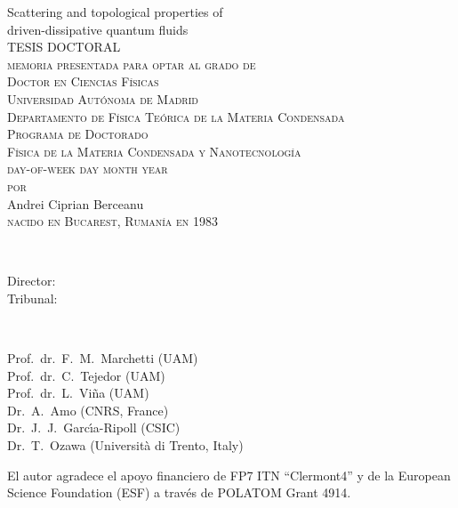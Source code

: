 \thispagestyle{empty}

\begin{center}
{\Huge  Scattering and topological properties of \\ driven-dissipative quantum fluids\\}
\vspace{5.4cm}
{\large{TESIS DOCTORAL}}\\
\vspace{2.6cm}
{ \textsc{memoria presentada para optar al grado de \\ Doctor en Ciencias F\'{i}sicas\\
Universidad Aut\'{o}noma de Madrid\\
Departamento de F\'{i}sica Te\'{o}rica de la Materia Condensada\\
Programa de Doctorado\\
F\'{i}sica de la Materia Condensada y Nanotecnolog\'{i}a\\
day-of-week day month year\\ %
$\,$\\$\,$\\por\\$\,$\\$\,$\\}
{\LARGE{Andrei Ciprian Berceanu}}\\$\,$ \\\textsc{nacido en Bucarest, Ruman\'{i}a en 1983}}
\end{center}
\newpage

\thispagestyle{empty}
\\[2ex]
  \parbox[t]{2.8cm}{Director:\\
                  Tribunal:
}~\parbox[t]{9cm}{Prof.\ dr.\ F.\ M.\ Marchetti (UAM) \\
Prof.\ dr.\ C.\ Tejedor (UAM) \\
Prof.\ dr.\ L.\ Vi\~{n}a (UAM) \\
Dr.\ A.\ Amo (CNRS, France) \\
Dr.\ J.\ J.\ Garc\'{\i}a-Ripoll (CSIC) \\
Dr.\ T.\ Ozawa (Universit\`{a} di Trento, Italy)
}


\vfill


\noindent
\begin{otherlanguage}{spanish}
El autor agradece el apoyo financiero de FP7 ITN ``Clermont4'' y
de la European Science Foundation (ESF) a trav\'{e}s de POLATOM Grant 4914.
\end{otherlanguage}
\vspace{\baselineskip}


